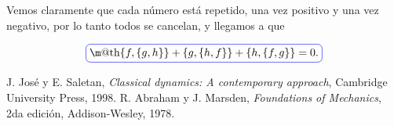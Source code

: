 \documentclass[a4paper,10pt]{article}
\makeatletter
\numberwithin{equation}{section}
\newcommand*{\boxcolor}{blue}
\renewcommand{\boxed}[1]{\textcolor{\boxcolor}{%
\tikz[baseline={([yshift=-1ex]current bounding box.center)}] \node [rectangle, minimum width=1ex,rounded corners,draw] {\normalcolor\m@th$\displaystyle#1$};}}
\makeatother
\begin{document}
Vemos claramente que cada número está repetido, una vez positivo y una vez negativo, 
por lo tanto todos se cancelan, y llegamos a que 

\begin{equation}
 \boxed{\{f,\{g,h\}\} + \{g,\{h,f\}\} + \{h,\{f,g\}\} = 0.}
\end{equation}



\begin{thebibliography}{20}
 J. José y E. Saletan, \emph{Classical dynamics: A contemporary approach}, Cambridge University Press,
 1998.
 R. Abraham y J. Marsden, \emph{Foundations of Mechanics}, 2da edición, Addison-Wesley,
 1978.
\end{thebibliography}
\end{document}
